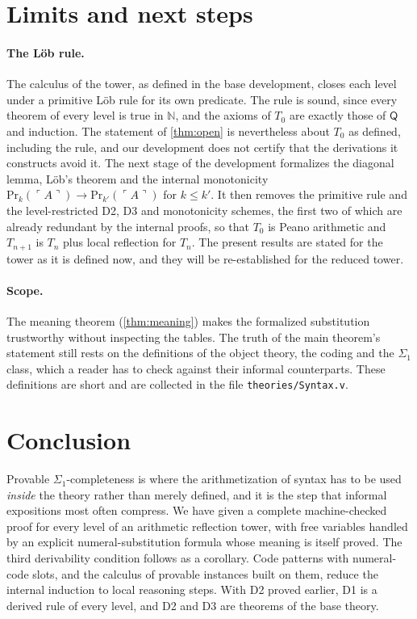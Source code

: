 \documentclass[11pt]{article}
\theoremstyle{plain}
\theoremstyle{definition}
\theoremstyle{remark}
\newcommand{\N}{\mathbb{N}}
\newcommand{\T}[1]{T_{#1}}
\newcommand{\Prv}{\mathrm{Pr}}
\newcommand{\gn}[1]{\ulcorner #1 \urcorner}
\newcommand{\rocq}[1]{\texttt{#1}}
\begin{document}
\section{Limits and next steps}\label{sec:limits}

\paragraph{The L\"ob rule.}
The calculus of the tower, as defined in the base development, closes
each level under a primitive L\"ob rule for its own predicate.  The rule
is sound, since every theorem of every level is true in $\N$, and the
axioms of $\T0$ are exactly those of $\mathsf{Q}$ and induction.  The
statement of \cref{thm:open} is nevertheless about $\T0$ as defined,
including the rule, and our development does not certify that the
derivations it constructs avoid it.  The next stage of the development
formalizes the diagonal lemma, L\"ob's theorem and the internal
monotonicity $\Prv_k(\gn{A}) \to \Prv_{k'}(\gn{A})$ for $k \le k'$.  It
then removes the primitive rule and the
level-restricted D2, D3 and monotonicity schemes, the first two of which
are already redundant by the internal proofs, so that $\T0$ is Peano
arithmetic and $\T{n+1}$ is $\T{n}$ plus local reflection for $\T{n}$.  The present results are stated for the tower as it is
defined now, and they will be re-established for the reduced tower.

\paragraph{Scope.}
The meaning theorem (\cref{thm:meaning}) makes the formalized
substitution trustworthy without inspecting the tables.  The truth of
the main theorem's statement still rests on the definitions of the
object theory, the coding and the $\Sigma_1$ class, which a reader has
to check against their informal counterparts.  These definitions are
short and are collected in the file \rocq{theories/Syntax.v}.

\section{Conclusion}

Provable $\Sigma_1$-completeness is where the arithmetization of
syntax has to be used \emph{inside} the theory rather than merely
defined, and it is the step that informal expositions most often
compress.  We have given a complete machine-checked proof for every
level of an arithmetic reflection tower, with free variables handled by
an explicit numeral-substitution formula whose meaning is itself
proved.  The third derivability condition follows as a corollary.
Code patterns with numeral-code slots, and the calculus of provable
instances built on them, reduce the internal induction to local
reasoning steps.  With D2 proved earlier, D1 is a derived rule of every
level, and D2 and D3 are theorems of the base theory.
\end{document}
